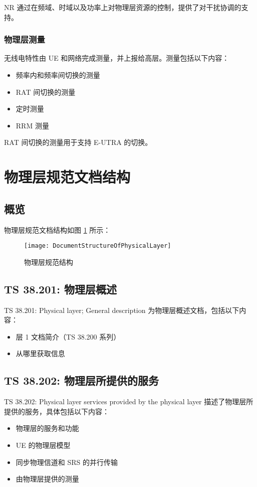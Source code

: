 \documentclass[cn,hazy,blue,14pt,screen,device=normal]{elegantnote}
\begin{document}
NR 通过在频域、时域以及功率上对物理层资源的控制，提供了对干扰协调的支持。

\subsubsection{物理层测量}
无线电特性由 UE 和网络完成测量，并上报给高层。测量包括以下内容：
\begin{itemize}[leftmargin=2cm]
	\item 频率内和频率间切换的测量
	\item RAT 间切换的测量
	\item 定时测量 
	\item RRM 测量 
\end{itemize}

RAT 间切换的测量用于支持 E-UTRA 的切换。

\section{物理层规范文档结构}
\subsection{概览}
物理层规范文档结构如图 \ref{DocumentStructureOfPhysicalLayer} 所示：
 \begin{figure}[!htbp]
 	\centering
 	\texttt{[image: DocumentStructureOfPhysicalLayer]}
 	\caption{物理层规范结构}
    \label{DocumentStructureOfPhysicalLayer}
 \end{figure}

\subsection{TS 38.201: 物理层概述}

TS 38.201: Physical layer; General description 为物理层概述文档，包括以下内容：
\begin{itemize}[leftmargin=2cm]
	\item 层 1 文档简介（TS 38.200 系列）
	\item 从哪里获取信息
\end{itemize}

\subsection{TS 38.202: 物理层所提供的服务}
TS 38.202: Physical layer services provided by the physical layer 描述了物理层所提供的服务，具体包括以下内容：
\begin{itemize}[leftmargin=2cm]
	\item 物理层的服务和功能
	\item UE 的物理层模型
	\item 同步物理信道和 SRS 的并行传输
	\item 由物理层提供的测量
\end{itemize}
\end{document}
